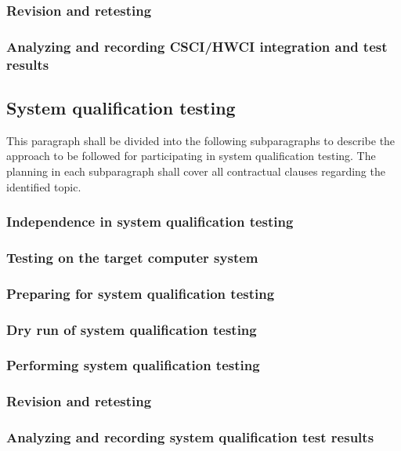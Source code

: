 \documentclass{fidata-report-template}
\begin{document}
\subsubsection{Revision and retesting}

\subsubsection{Analyzing and recording CSCI/HWCI integration and test
results}

\subsection{System qualification testing}

This paragraph shall be divided into the following subparagraphs to
describe the approach to be followed for participating in system
qualification testing. The planning in each subparagraph shall cover all
contractual clauses regarding the identified topic.

\subsubsection{Independence in system qualification testing}

\subsubsection{Testing on the target computer system}

\subsubsection{Preparing for system qualification testing}

\subsubsection{Dry run of system qualification testing}

\subsubsection{Performing system qualification testing}

\subsubsection{Revision and retesting}

\subsubsection{Analyzing and recording system qualification test
results}
\end{document}
